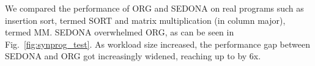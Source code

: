 \documentclass[letter]{ieice}
\begin{document}
{\color{blue}
We compared the performance of ORG and \hbox{SEDONA} on 
real programs such as insertion sort, termed SORT and 
matrix multiplication (in column major), termed MM. 
SEDONA overwhelmed ORG, as can be seen in Fig.~\ref{fig:synprog_test}. 
As workload size increased, 
the performance gap between SEDONA and ORG got increasingly widened, reaching up to by 6x.

\begin{figure}[htp!]
	\centering
\end{figure}}
\end{document}
